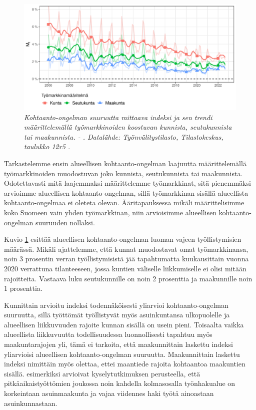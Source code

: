 \documentclass[12pt]{article}
\newcommand{\lastdatamonth}{\unskip}
\newcommand{\firstdatamonth}{\unskip}
\newcommand{\newcaption}[1]{\caption{\textit{\footnotesize{#1}}}}
\begin{document}
\begin{figure}
\centering
\includegraphics[scale = 0.8]{../kuviot/indeksi_alueittain.pdf}
    \newcaption{Kohtaanto-ongelman suuruutta mittaava indeksi ja sen trendi määrittelemällä työmarkkinoiden koostuvan kunnista, seutukunnista tai maakunnista.  \protect \firstdatamonth \phantom{} - \protect\lastdatamonth. Datalähde: Työnvälitystilasto, Tilastokeskus, taulukko 12r5 \protect \cite{svt2011}.}
   \label{fig:kdieksl}
\end{figure}


Tarkastelemme ensin alueellisen kohtaanto-ongelman laajuutta määrittelemällä työmarkkinoiden muodostuvan joko kunnista, seutukunnista tai maakunnista. Odotettavasti mitä laajemmaksi määrittelemme työmarkkinat, sitä pienemmäksi arvioimme alueellisen kohtaanto-ongelman, sillä työmarkkinan sisällä alueellista kohtaanto-ongelmaa ei oleteta olevan. Ääritapauksessa mikäli määrittelisimme koko Suomeen vain yhden työmarkkinan, niin arvioisimme alueellisen kohtaanto-ongelman suuruuden nollaksi.

Kuvio \ref{fig:kdieksl} esittää alueellisen kohtaanto-ongelman luoman vajeen työllistymisien määrässä. Mikäli ajattelemme, että kunnat muodostavat omat työmarkkinansa, noin 3 prosentin verran työllistymisistä jää tapahtumatta kuukausittain vuonna 2020 verrattuna tilanteeseen, jossa kuntien väliselle liikkumiselle ei olisi mitään rajoitteita. Vastaava luku seutukunnille on noin 2 prosenttia ja maakunnille noin 1 prosenttia. 

Kunnittain arvioitu indeksi todennäköisesti yliarvioi kohtaanto-ongelman suuruutta, sillä työttömät työllistyvät myös asuinkuntansa ulkopuolelle \cite{alasalmi2020tyon} ja alueellisen liikkuvuuden rajoite kunnan sisällä on usein pieni. Toisaalta vaikka alueellista liikkuvuutta todellisuudessa luonnollisesti tapahtuu myös maakuntarajojen yli, tämä ei tarkoita, että maakunnittain laskettu indeksi yliarvioisi alueellisen kohtaanto-ongelman suuruutta. Maakunnittain laskettu indeksi nimittäin myös olettaa, ettei maantiede rajoita kohtaantoa maakuntien sisällä.  esimerkiksi arvioivat kyselytutkimuksen perusteella, että pitkäaikaistyöttömien joukossa noin kahdella kolmasosalla työnhakualue on korkeintaan asuinmaakunta ja vajaa viidennes haki työtä ainoastaan asuinkunnastaan.  
\end{document}

